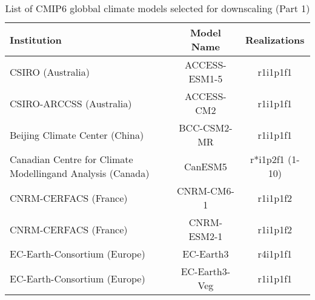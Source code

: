 \documentclass[]{scrartcl}
\begin{document}
\begin{table}[ht]
	\caption{List of CMIP6 globbal climate models selected for downscaling (Part 1)}\label{table:gcm1}
	\begin{center}
	\begin{tabularx}{\linewidth}{|L|cc|} 
			\hline
			\textbf{Institution} & \textbf{Model Name} & \textbf{Realizations}  \\
			\hline
			CSIRO (Australia)                     & ACCESS-ESM1-5 & r1i1p1f1   \\
			CSIRO-ARCCSS (Australia) & ACCESS-CM2 & r1i1p1f1 \\
		    Beijing Climate Center (China) & BCC-CSM2-MR & r1i1p1f1  \\
		    Canadian Centre for Climate Modelling\newline and Analysis (Canada) & CanESM5 & r*i1p2f1 (1-10) \\
			CNRM-CERFACS (France) & CNRM-CM6-1 & r1i1p1f2 \\  	
			CNRM-CERFACS (France) & CNRM-ESM2-1 & r1i1p1f2 \\	  
			EC-Earth-Consortium (Europe) & EC-Earth3 & r4i1p1f1 \\
			EC-Earth-Consortium (Europe) & EC-Earth3-Veg & r1i1p1f1 \\	  
			\hline
		\end{tabularx}
	\end{center}
\end{table}
\end{document}
